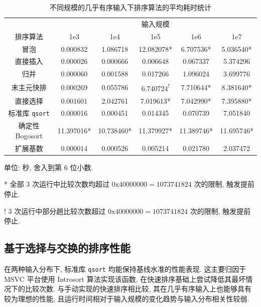 \documentclass[12pt]{article}
\begin{document}
\begin{table}
\centering
\begin{threeparttable}
    \caption{不同规模的几乎有序输入下排序算法的平均耗时统计}
    \begin{tabular}{cccccc}
        \toprule
         & \multicolumn{5}{c}{输入规模} \\
        排序算法 & 1e3 & 1e4 & 1e5 & 1e6 & 1e7 \\
        \midrule
        冒泡 & 0.000832 & 1.086718 & 12.082078* & 6.707536* & 5.036540* \\
        直接插入 & 0.000026 & 0.000666 & 0.006648 & 0.067337 & 5.374296 \\
        归并 & 0.000060 & 0.001588 & 0.017266 & 1.096024 & 3.699776 \\
        末主元快排 & 0.000269 & 0.055786 & 6.740724\textsuperscript{!} & 7.710644* & 8.381640* \\
        直接选择 & 0.001601 & 2.042761 & 7.019613* & 7.042990* & 7.395880* \\
        标准库 \texttt{qsort} & 0.000016 & 0.000451 & 0.014345 & 0.070739 & 7.051840 \\
        确定性 Bogosort & 11.397016* & 10.738460* & 11.379927* & 11.389746* & 11.695746* \\
        扩展基数 & 0.000014 & 0.000526 & 0.005214 & 0.021780 & 2.037472 \\
        \bottomrule
    \end{tabular}
    \begin{tablenotes}
        \small
        \item 单位: 秒, 舍入到第 6 位小数.
        \item[*] 全部 3 次运行中比较次数均超过 $0\mathrm{x}40000000 = 1073741824$ 次的限制, 触发提前停止.
        \item[!] 3 次运行中部分趟比较次数超过 $0\mathrm{x}40000000 = 1073741824$ 次的限制, 触发提前停止.
    \end{tablenotes}
    \label{table_result_almost_rising}
\end{threeparttable}
\end{table}

\subsection{基于选择与交换的排序性能}

在两种输入分布下, 标准库 \texttt{qsort} 均能保持基线水准的性能表现. 这主要归因于 MSVC 平台使用 Introsort 算法实现该函数, 在快速排序基础上尝试降低其最坏情况下的比较次数. 与手动实现的快速排序相比较, 其在几乎有序输入上也能够具有较为理想的性能, 且运行时间相对于输入规模的变化趋势与输入分布相关性较弱.
\end{document}
